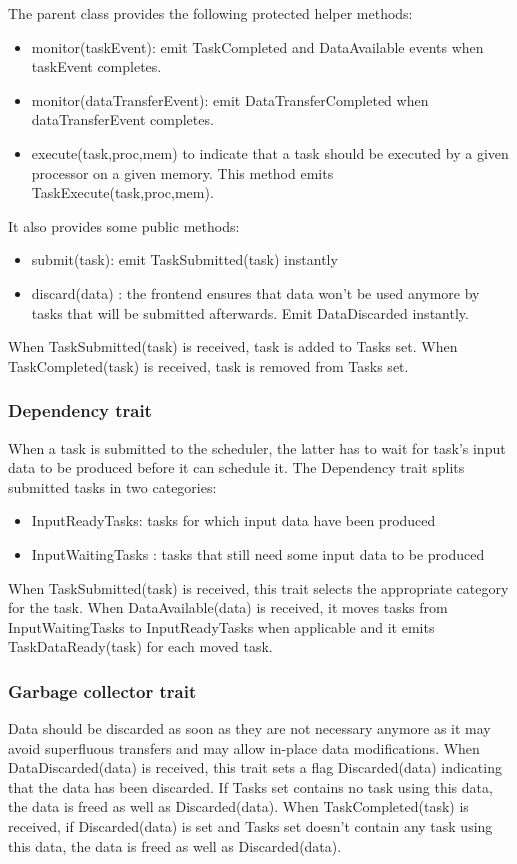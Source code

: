 The parent class provides the following protected helper methods:
\begin{itemize}
  \item monitor(taskEvent): emit TaskCompleted and DataAvailable events when taskEvent completes.
  \item monitor(dataTransferEvent): emit DataTransferCompleted when dataTransferEvent completes.
  \item execute(task,proc,mem) to indicate that a task should be executed by a given processor on a given memory. This method emits TaskExecute(task,proc,mem).
\end{itemize}
It also provides some public methods:
\begin{itemize}
  \item submit(task): emit TaskSubmitted(task) instantly
  \item discard(data) : the frontend ensures that data won't be used anymore by tasks that will be submitted afterwards. Emit DataDiscarded instantly.
\end{itemize}

When TaskSubmitted(task) is received, task is added to Tasks set.
When TaskCompleted(task) is received, task is removed from Tasks set.

\subsubsection{Dependency trait}
When a task is submitted to the scheduler, the latter has to wait for task's input data to be produced before it can schedule it.
The Dependency trait splits submitted tasks in two categories:
\begin{itemize}
  \item InputReadyTasks: tasks for which input data have been produced
  \item InputWaitingTasks : tasks that still need some input data to be produced
\end{itemize}

When TaskSubmitted(task) is received, this trait selects the appropriate category for the task.
When DataAvailable(data) is received, it moves tasks from InputWaitingTasks to InputReadyTasks when applicable and it emits TaskDataReady(task) for each moved task.

\subsubsection{Garbage collector trait}
Data should be discarded as soon as they are not necessary anymore as it may avoid superfluous transfers and may allow in-place data modifications.
When DataDiscarded(data) is received, this trait sets a flag Discarded(data) indicating that the data has been discarded.
If Tasks set contains no task using this data, the data is freed as well as Discarded(data).
When TaskCompleted(task) is received, if Discarded(data) is set and Tasks set doesn't contain any task using this data, the data is freed as well as Discarded(data).


